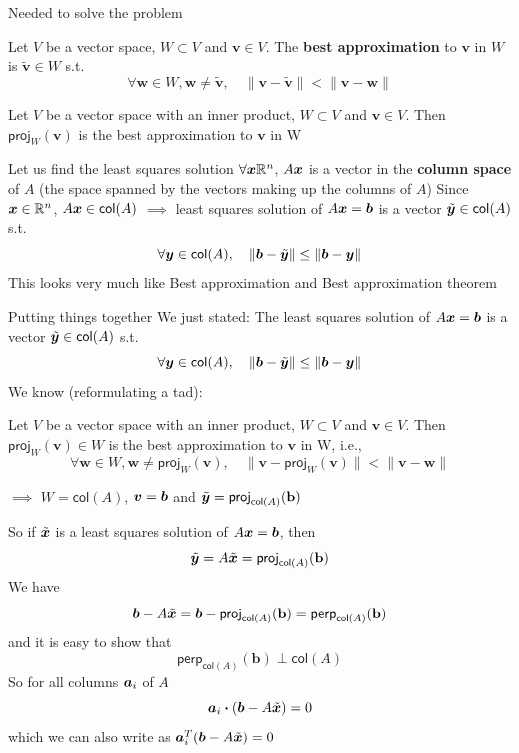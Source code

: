 \documentclass[aspectratio=169]{beamer}
\begin{document}
\begin{frame}{Needed to solve the problem}
\begin{definition}
Let $V$ be a vector space, $W\subset V$ and $\mathbf{v}\in V$. The \textbf{best approximation} to $\mathbf{v}$ in $W$ is $\tilde{\mathbf{v}}\in W$ s.t.
\[
\forall\mathbf{w}\in W, \mathbf{w}\neq\tilde{\mathbf{v}}, \quad
\|\mathbf{v}-\tilde{\mathbf{v}}\| < \|\mathbf{v}-\mathbf{w}\|
\]
\end{definition}
\vfill
\begin{theorem}
Let $V$ be a vector space with an inner product, $W\subset V$ and $\mathbf{v}\in V$. Then $\mathsf{proj}_W(\mathbf{v})$ is the best approximation to $\mathbf{v}$ in W
\end{theorem}
\end{frame}


\begin{frame}{Let us find the least squares solution}
$\forall \bm{x}\mathbb{R}^n$, $A\bm{x}$ is a vector in the \textbf{column space} of $A$ (the space spanned by the vectors making up the columns of $A$)
\vfill
Since $\bm{x}\in\mathbb{R}^n$, $A\bm{x}\in\mathsf{col}(A)$
\vfill
$\implies$ least squares solution of $A\bm{x}=\bm{b}$ is a vector $\tilde{\bm{y}}\in\mathsf{col}(A)$ s.t.
\[
\forall\bm{y}\in\mathsf{col}(A),\quad\|\bm{b}-\tilde{\bm{y}}\|\leq\|\bm{b}-\bm{y}\|
\]
\vfill
This looks very much like Best approximation and Best approximation theorem
\end{frame}

\begin{frame}{Putting things together}
We just stated: The least squares solution of $A\bm{x}=\bm{b}$ is a vector $\tilde{\bm{y}}\in\mathsf{col}(A)$ s.t.
\[
\forall\bm{y}\in\mathsf{col}(A),\quad\|\bm{b}-\tilde{\bm{y}}\|\leq\|\bm{b}-\bm{y}\|
\]
\vfill
We know (reformulating a tad):
\begin{theorem}
Let $V$ be a vector space with an inner product, $W\subset V$ and $\mathbf{v}\in V$. Then $\mathsf{proj}_W(\mathbf{v})\in W$ is the best approximation to $\mathbf{v}$ in W, i.e.,
\[
\forall\mathbf{w}\in W, \mathbf{w}\neq\mathsf{proj}_W(\mathbf{v}), \quad
\|\mathbf{v}-\mathsf{proj}_W(\mathbf{v})\| < \|\mathbf{v}-\mathbf{w}\|
\]
\end{theorem}
\vfill
$\implies$ $W=\mathsf{col}(A)$, $\bm{v}=\bm{b}$ and $\tilde{\bm{y}}=\mathsf{proj}_{\mathsf{col}(A)}(\mathbf{b})$
\end{frame}

\begin{frame}
So if $\tilde{\bm{x}}$ is a least squares solution of $A\bm{x}=\bm{b}$, then
\[
\tilde{\bm{y}} = A\tilde{\bm{x}} = \mathsf{proj}_{\mathsf{col}(A)}(\mathbf{b})
\]
\vfill
We have
\[
\bm{b}-A\tilde{\bm{x}} = \bm{b}-\mathsf{proj}_{\mathsf{col}(A)}(\mathbf{b}) 
= \mathsf{perp}_{\mathsf{col}(A)}(\mathbf{b})
\]
and it is easy to show that
\[
\mathsf{perp}_{\mathsf{col}(A)}(\mathbf{b}) \perp \mathsf{col}(A)
\]
\vfill
So for all columns $\bm{a}_i$ of $A$
\[
\bm{a}_i\boldsymbol{\cdot}(\bm{b}-A\tilde{\bm{x}}) = 0
\]
which we can also write as $\bm{a}_i^T(\bm{b}-A\tilde{\bm{x}}) = 0$
\end{frame}
\end{document}
